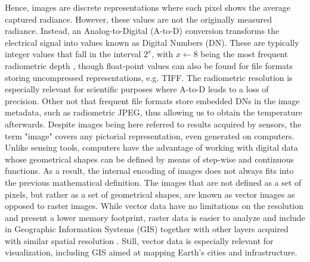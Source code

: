 Hence, images are discrete representations where each pixel shows the average captured radiance. However, these values are not the originally measured radiance. Instead, an Analog-to-Digital (A-to-D) conversion transforms the electrical signal into values known as Digital Numbers (DN). These are typically integer values that fall in the interval $2^x$, with $x \gets 8$ being the most frequent radiometric depth \cite{navulur_multispectral_2006}, though float-point values can also be found for file formats storing uncompressed representations, e.g. TIFF. The radiometric resolution is especially relevant for scientific purposes where A-to-D leads to a loss of precision. Other not that frequent file formats store embedded DNs in the image metadata, such as radiometric JPEG, thus allowing us to obtain the temperature afterwards. Despite images being here referred to results acquired by sensors, the term "image" covers any pictorial representation, even generated on computers. Unlike sensing tools, computers have the advantage of working with digital data whose geometrical shapes can be defined by means of step-wise and continuous functions. As a result, the internal encoding of images does not always fits into the previous mathematical definition. The images that are not defined as a set of pixels, but rather as a set of geometrical shapes, are known as vector images as opposed to raster images. While vector data have no limitations on the resolution and present a lower memory footprint, raster data is easier to analyze and include in Geographic Information Systems (GIS) together with other layers acquired with similar spatial resolution \cite{lillesand_remote_2015}. Still, vector data is especially relevant for visualization, including GIS aimed at mapping Earth's cities and infrastructure.
